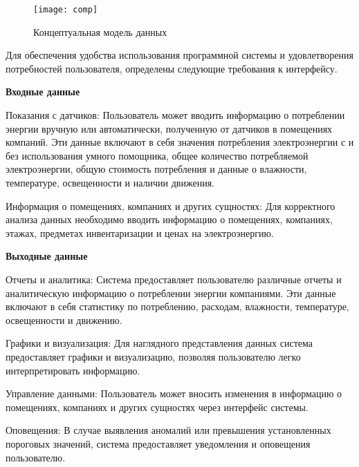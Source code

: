 \begin{figure}[ht]
	\center\texttt{[image: comp]}
	\caption{Концептуальная модель данных}
	\label{comp:image}
\end{figure}



Для обеспечения удобства использования программной системы и удовлетворения потребностей пользователя, определены следующие требования к интерфейсу.

\textbf{Входные данные}

{Показания с датчиков:} Пользователь может вводить информацию о потреблении энергии вручную или автоматически, полученную от датчиков в помещениях компаний. Эти данные включают в себя значения потребления электроэнергии с и без использования умного помощника, общее количество потребляемой электроэнергии, общую стоимость потребления и данные о влажности, температуре, освещенности и наличии движения.

{Информация о помещениях, компаниях и других сущностях:} Для корректного анализа данных необходимо вводить информацию о помещениях, компаниях, этажах, предметах инвентаризации и ценах на электроэнергию.

\textbf{Выходные данные}

{Отчеты и аналитика:} Система предоставляет пользователю различные отчеты и аналитическую информацию о потреблении энергии компаниями. Эти данные включают в себя статистику по потреблению, расходам, влажности, температуре, освещенности и движению.

{Графики и визуализация:} Для наглядного представления данных система предоставляет графики и визуализацию, позволяя пользователю легко интерпретировать информацию.

{Управление данными:} Пользователь может вносить изменения в информацию о помещениях, компаниях и других сущностях через интерфейс системы.

{Оповещения:} В случае выявления аномалий или превышения установленных пороговых значений, система предоставляет уведомления и оповещения пользователю.

